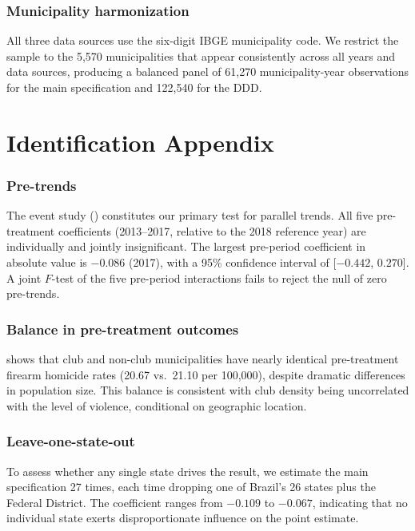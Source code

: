 \documentclass[12pt]{article}
\begin{document}
\subsubsection*{Municipality harmonization} All three data sources use the six-digit IBGE municipality code. We restrict the sample to the 5,570 municipalities that appear consistently across all years and data sources, producing a balanced panel of 61,270 municipality-year observations for the main specification and 122,540 for the DDD.


\section{Identification Appendix}
\label{sec:appendix_id}

\subsubsection*{Pre-trends} The event study () constitutes our primary test for parallel trends. All five pre-treatment coefficients (2013--2017, relative to the 2018 reference year) are individually and jointly insignificant. The largest pre-period coefficient in absolute value is $-0.086$ (2017), with a 95\% confidence interval of [$-0.442$, $0.270$]. A joint $F$-test of the five pre-period interactions fails to reject the null of zero pre-trends.

\subsubsection*{Balance in pre-treatment outcomes}  shows that club and non-club municipalities have nearly identical pre-treatment firearm homicide rates (20.67 vs.\ 21.10 per 100,000), despite dramatic differences in population size. This balance is consistent with club density being uncorrelated with the level of violence, conditional on geographic location.

\subsubsection*{Leave-one-state-out} To assess whether any single state drives the result, we estimate the main specification 27 times, each time dropping one of Brazil's 26 states plus the Federal District. The coefficient ranges from $-0.109$ to $-0.067$, indicating that no individual state exerts disproportionate influence on the point estimate.
\end{document}
